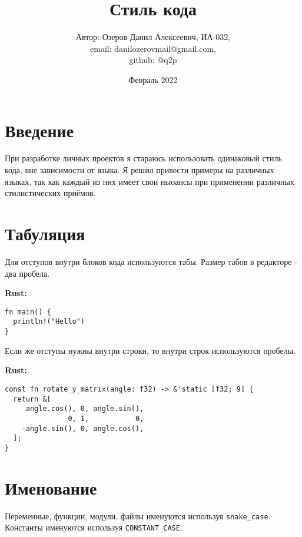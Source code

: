 \documentclass[12p]{article}
\begin{document}
\title{Стиль кода}
\author{Автор: Озеров Данил Алексеевич, ИА-032,\\ email: danilozerovmail@gmail.com,\\ github: @q2p}
\date{Февраль 2022}

\maketitle

\section{Введение}

При разработке личных проектов я стараюсь использовать одинаковый стиль кода, вне зависимости от языка.
Я решил привести примеры на различных языках, так как каждый из них имеет свои ньюансы при применении различных стилистических приёмов.

\section{Табуляция}

Для отступов внутри блоков кода используются табы. Размер табов в редакторе - два пробела.\newline

\textbf{Rust:}
\begin{verbatim}
fn main() {
  println!("Hello")
}
\end{verbatim}

Если же отступы нужны внутри строки, то внутри строк используются пробелы.\newline

\textbf{Rust:}
\begin{verbatim}
const fn rotate_y_matrix(angle: f32) -> &'static [f32; 9] {
  return &[
     angle.cos(), 0, angle.sin(),
               0, 1,           0,
    -angle.sin(), 0, angle.cos(),
  ];
}
\end{verbatim}
\pagebreak

\section{Именование}

Переменные, функции, модули, файлы именуются используя \texttt{snake_case}. Константы именуются используя \texttt{CONSTANT_CASE}.\newline
\end{document}
